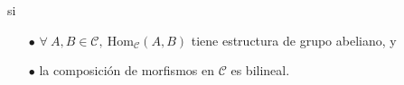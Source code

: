 \documentclass[preview]{standalone}
\begin{document}
\begin{center}
si \begin{itemize} \item[$\bullet$] $\forall \ A,B\in\mathscr{C}, \ \text{Hom}_\mathscr{C}(A,B)$ tiene estructura de grupo abeliano, y \item[$\bullet$] la composición de morfismos en $\mathscr{C}$ es bilineal.\end{itemize}
\end{center}
\end{document}
